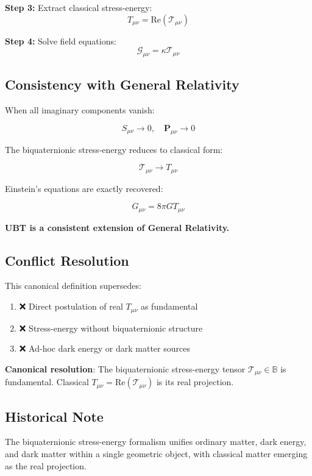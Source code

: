 \textbf{Step 3:} Extract classical stress-energy:
\begin{equation}
T_{\mu\nu} = \text{Re}(\mathcal{T}_{\mu\nu})
\end{equation}

\textbf{Step 4:} Solve field equations:
\begin{equation}
\mathcal{G}_{\mu\nu} = \kappa \mathcal{T}_{\mu\nu}
\end{equation}

\subsection{Consistency with General Relativity}

When all imaginary components vanish:

\begin{equation}
S_{\mu\nu} \to 0, \quad \mathbf{P}_{\mu\nu} \to 0
\end{equation}

The biquaternionic stress-energy reduces to classical form:

\begin{equation}
\mathcal{T}_{\mu\nu} \to T_{\mu\nu}
\end{equation}

Einstein's equations are exactly recovered:

\begin{equation}
G_{\mu\nu} = 8\pi G T_{\mu\nu}
\end{equation}

\textbf{UBT is a consistent extension of General Relativity.}

\subsection{Conflict Resolution}

This canonical definition supersedes:

\begin{enumerate}
    \item ❌ Direct postulation of real $T_{\mu\nu}$ as fundamental
    \item ❌ Stress-energy without biquaternionic structure
    \item ❌ Ad-hoc dark energy or dark matter sources
\end{enumerate}

\textbf{Canonical resolution}: The biquaternionic stress-energy tensor $\mathcal{T}_{\mu\nu} \in \mathbb{B}$ is fundamental. Classical $T_{\mu\nu} = \text{Re}(\mathcal{T}_{\mu\nu})$ is its real projection.

\subsection{Historical Note}

The biquaternionic stress-energy formalism unifies ordinary matter, dark energy, and dark matter within a single geometric object, with classical matter emerging as the real projection.

